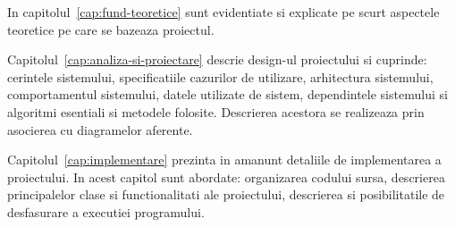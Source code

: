 In capitolul~\ref{cap:fund-teoretice} sunt evidentiate si explicate pe scurt aspectele teoretice pe care se bazeaza proiectul.

Capitolul~\ref{cap:analiza-si-proiectare} descrie design-ul proiectului si cuprinde: cerintele sistemului, specificatiile cazurilor de utilizare, arhitectura sistemului, comportamentul sistemului, datele utilizate de sistem, dependintele sistemului si algoritmi esentiali si metodele folosite. Descrierea acestora se realizeaza prin asocierea cu diagramelor aferente.


Capitolul~\ref{cap:implementare} prezinta in amanunt detaliile de implementarea a proiectului. In acest capitol sunt abordate: organizarea codului sursa, descrierea principalelor clase si functionalitati ale proiectului, descrierea  si posibilitatile de desfasurare a executiei programului.